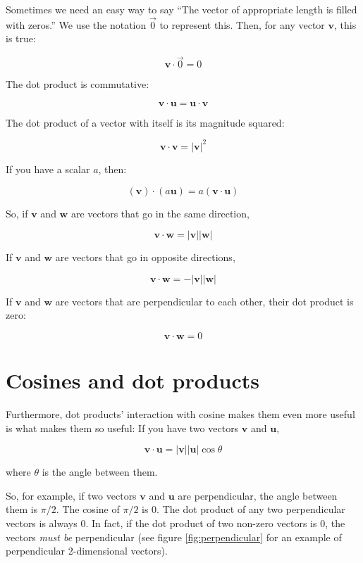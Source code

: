 Sometimes we need an easy way to say ``The vector of appropriate length is 
filled with zeros.'' We use the notation $\vec{0}$ to represent this. Then, 
for any vector $\textbf{v}$, this is true:

$$\textbf{v} \cdot \vec{0} = 0$$

The dot product is commutative:

$$\textbf{v} \cdot \textbf{u} = \textbf{u} \cdot \textbf{v}$$

The dot product of a vector with itself is its magnitude squared:

$$ \textbf{v} \cdot \textbf{v} = |\textbf{v}|^2 $$

If you have a scalar $a$, then:

    $$(\textbf{v}) \cdot (a \textbf{u}) = a (\textbf{v} \cdot \textbf{u})$$

So, if $\textbf{v}$ and $\textbf{w}$ are vectors that go in the same direction,

    $$\textbf{v} \cdot \textbf{w} = |\textbf{v}| |\textbf{w}|$$

If $\textbf{v}$ and $\textbf{w}$ are vectors that go in opposite directions,

    $$\textbf{v} \cdot \textbf{w} = -|\textbf{v}| |\textbf{w}|$$
    
If $\textbf{v}$ and $\textbf{w}$ are vectors that are perpendicular to each 
other, their dot product is zero:

  $$ \textbf{v} \cdot \textbf{w} = 0 $$

\section{Cosines and dot products}

Furthermore, dot products' interaction with cosine makes them even more useful 
is what makes them so useful: 
If you have two vectors $\textbf{v}$ and $\textbf{u}$,

$$\textbf{v} \cdot \textbf{u} = |\textbf{v}| |\textbf{u}| \cos \theta$$

where $\theta$ is the angle between them.

So, for example, if two vectors $\textbf{v}$ and $\textbf{u}$ are 
perpendicular, the angle between them is $\pi/2$. The cosine of $\pi/2$ is 0. 
The dot product of any two perpendicular vectors is always 0. In fact, if the 
dot product of two non-zero vectors is 0, the vectors \textit{must be} 
perpendicular (see figure \ref{fig:perpendicular} for an example of 
perpendicular 2-dimensional vectors). 

